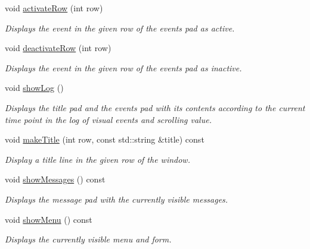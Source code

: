 \begin{DoxyCompactItemize}
void \hyperlink{structLogWindow_ac476f059caf78ae7f293dd301d167b87}{activate\+Row} (int row)
\begin{DoxyCompactList}\small\item\em Displays the event in the given row of the events pad as active. \end{DoxyCompactList}\item 
void \hyperlink{structLogWindow_acf1d85fd8cd6f169e83654adb82b9160}{deactivate\+Row} (int row)
\begin{DoxyCompactList}\small\item\em Displays the event in the given row of the events pad as inactive. \end{DoxyCompactList}\item 
void \hyperlink{structLogWindow_ad9072c7fa9376e871af83e4ad3e14c13}{show\+Log} ()\hypertarget{structLogWindow_ad9072c7fa9376e871af83e4ad3e14c13}{}\label{structLogWindow_ad9072c7fa9376e871af83e4ad3e14c13}

\begin{DoxyCompactList}\small\item\em Displays the title pad and the events pad with its contents according to the current time point in the log of visual events and scrolling value. \end{DoxyCompactList}\item 
void \hyperlink{structLogWindow_a6f410fb254ec6d22deae3b98342831a9}{make\+Title} (int row, const std\+::string \&title) const 
\begin{DoxyCompactList}\small\item\em Display a title line in the given row of the window. \end{DoxyCompactList}\item 
void \hyperlink{structLogWindow_a60fc6d27670acfa9f209c0194fe1ebd4}{show\+Messages} () const \hypertarget{structLogWindow_a60fc6d27670acfa9f209c0194fe1ebd4}{}\label{structLogWindow_a60fc6d27670acfa9f209c0194fe1ebd4}

\begin{DoxyCompactList}\small\item\em Displays the message pad with the currently visible messages. \end{DoxyCompactList}\item 
void \hyperlink{structLogWindow_a0841a0567c9b3bbb7515e9c87b68d942}{show\+Menu} () const \hypertarget{structLogWindow_a0841a0567c9b3bbb7515e9c87b68d942}{}\label{structLogWindow_a0841a0567c9b3bbb7515e9c87b68d942}

\begin{DoxyCompactList}\small\item\em Displays the currently visible menu and form. \end{DoxyCompactList}\end{DoxyCompactItemize}
